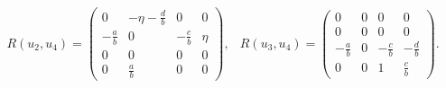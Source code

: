 \documentclass{amsart}
\theoremstyle{plain}
\theoremstyle{remark}
\begin{document}
{{\begin{equation}
\begin{array}{ll}
R(u_2,u_4)=\left( \begin {array}{cccc} 0&-\eta-{\frac {{d}}{b}}&0&0\\ -{\frac {a}{b}}&0&-{\frac {c}{b}}&\eta \\ 0&0&0&0\\ 0&{\frac {a}{b}}&0&0\end {array} \right), &R(u_3,u_4)=\left( \begin {array}{cccc} 0&0&0&0\\0&0&0&0\\ -{\frac {a}{b}}&0&-{\frac {c}{b}}&-{\frac {d}{b}}\\ 0&0&1&{\frac {c}{b}}\end {array} \right).
\end{array}
\end{equation}
}

}
\end{document}
